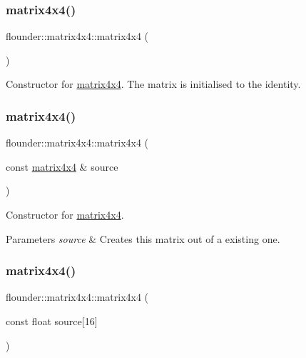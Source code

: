 \subsubsection{\texorpdfstring{matrix4x4()}{matrix4x4()}\hspace{0.1cm}{\footnotesize\ttfamily [1/3]}}
{\footnotesize\ttfamily flounder\+::matrix4x4\+::matrix4x4 (\begin{DoxyParamCaption}{ }\end{DoxyParamCaption})}



Constructor for \hyperlink{classflounder_1_1matrix4x4}{matrix4x4}. The matrix is initialised to the identity. 

\mbox{\label{classflounder_1_1matrix4x4_aec9982737aef5ba76a18fb37faa51301}} 
\subsubsection{\texorpdfstring{matrix4x4()}{matrix4x4()}\hspace{0.1cm}{\footnotesize\ttfamily [2/3]}}
{\footnotesize\ttfamily flounder\+::matrix4x4\+::matrix4x4 (\begin{DoxyParamCaption}\item[{const \hyperlink{classflounder_1_1matrix4x4}{matrix4x4} \&}]{source }\end{DoxyParamCaption})}



Constructor for \hyperlink{classflounder_1_1matrix4x4}{matrix4x4}. 


\begin{DoxyParams}{Parameters}
{\em source} & Creates this matrix out of a existing one. \\
\hline
\end{DoxyParams}
\mbox{\label{classflounder_1_1matrix4x4_a9b162e9c19b5e53f0e8d7cda761fe415}} 
\subsubsection{\texorpdfstring{matrix4x4()}{matrix4x4()}\hspace{0.1cm}{\footnotesize\ttfamily [3/3]}}
{\footnotesize\ttfamily flounder\+::matrix4x4\+::matrix4x4 (\begin{DoxyParamCaption}\item[{const float}]{source\mbox{[}16\mbox{]} }\end{DoxyParamCaption})}



